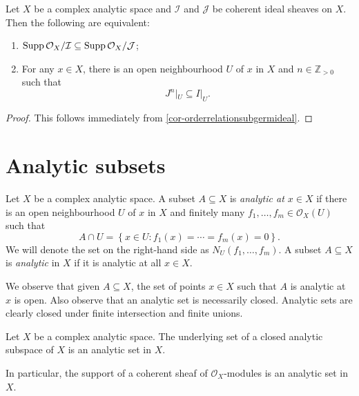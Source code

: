 \begin{corollary}
    Let $X$ be a complex analytic space and $\mathcal{I}$ and $\mathcal{J}$ be coherent ideal sheaves on $X$. Then the following are equivalent:
    \begin{enumerate}
        \item $\operatorname{Supp} \mathcal{O}_X/\mathcal{I}\subseteq \operatorname{Supp} \mathcal{O}_X/\mathcal{J}$;
        \item For any $x\in X$, there is an open neighbourhood $U$ of $x$ in $X$ and $n\in \mathbb{Z}_{>0}$ such that
            \[
                J^n|_U\subseteq I|_U.
            \]
    \end{enumerate}
\end{corollary}
\begin{proof}
    This follows immediately from \cref{cor-orderrelationsubgermideal}.
\end{proof}


\section{Analytic subsets}

\begin{definition}
    Let $X$ be a complex analytic space. A subset $A\subseteq X$ is \emph{analytic at $x\in X$} if there is an open neighbourhood $U$ of $x$ in $X$ and finitely many $f_1,\ldots,f_m\in \mathcal{O}_X(U)$ such that 
    \[
        A\cap U=\left\{ x\in U: f_1(x)=\cdots=f_m(x)=0 \right\}.  
    \]
    We will denote the set on the right-hand side as $N_U(f_1,\ldots,f_m)$.
    A subset $A\subseteq X$ is \emph{analytic} in $X$ if it is analytic at all $x\in X$.
\end{definition}
We observe that given $A\subseteq X$, the set of points $x\in X$ such that $A$ is analytic at $x$ is open. Also observe that an analytic set is necessarily closed.
Analytic sets are clearly closed under finite intersection and finite unions.

\begin{example}\label{ex-closedanalyticspaceanalyt}
    Let $X$ be a complex analytic space. 
    The underlying set of a closed analytic subspace of $X$ is an analytic set in $X$.

    In particular, the support of a coherent sheaf of $\mathcal{O}_X$-modules is an analytic set in $X$.
\end{example}

